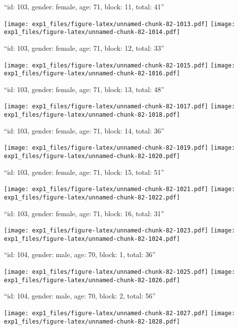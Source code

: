 \documentclass[11pt,,]{article}
\begin{document}
\newpage
[1] 

``id: 103, gender: female, age: 71, block: 11, total: 41''

\texttt{[image: exp1\_files/figure-latex/unnamed-chunk-82-1013.pdf]}
\texttt{[image: exp1\_files/figure-latex/unnamed-chunk-82-1014.pdf]}

\newpage
[1] 

``id: 103, gender: female, age: 71, block: 12, total: 33''

\texttt{[image: exp1\_files/figure-latex/unnamed-chunk-82-1015.pdf]}
\texttt{[image: exp1\_files/figure-latex/unnamed-chunk-82-1016.pdf]}

\newpage
[1] 

``id: 103, gender: female, age: 71, block: 13, total: 48''

\texttt{[image: exp1\_files/figure-latex/unnamed-chunk-82-1017.pdf]}
\texttt{[image: exp1\_files/figure-latex/unnamed-chunk-82-1018.pdf]}

\newpage
[1] 

``id: 103, gender: female, age: 71, block: 14, total: 36''

\texttt{[image: exp1\_files/figure-latex/unnamed-chunk-82-1019.pdf]}
\texttt{[image: exp1\_files/figure-latex/unnamed-chunk-82-1020.pdf]}

\newpage
[1] 

``id: 103, gender: female, age: 71, block: 15, total: 51''

\texttt{[image: exp1\_files/figure-latex/unnamed-chunk-82-1021.pdf]}
\texttt{[image: exp1\_files/figure-latex/unnamed-chunk-82-1022.pdf]}

\newpage
[1] 

``id: 103, gender: female, age: 71, block: 16, total: 31''

\texttt{[image: exp1\_files/figure-latex/unnamed-chunk-82-1023.pdf]}
\texttt{[image: exp1\_files/figure-latex/unnamed-chunk-82-1024.pdf]}

\newpage
[1] 

``id: 104, gender: male, age: 70, block: 1, total: 36''

\texttt{[image: exp1\_files/figure-latex/unnamed-chunk-82-1025.pdf]}
\texttt{[image: exp1\_files/figure-latex/unnamed-chunk-82-1026.pdf]}

\newpage
[1] 

``id: 104, gender: male, age: 70, block: 2, total: 56''

\texttt{[image: exp1\_files/figure-latex/unnamed-chunk-82-1027.pdf]}
\texttt{[image: exp1\_files/figure-latex/unnamed-chunk-82-1028.pdf]}
\end{document}

